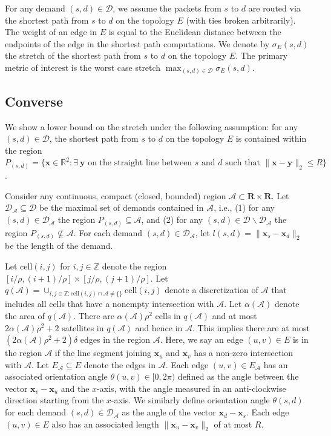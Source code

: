 \documentclass[acmsmall, screen]{acmart}
\begin{document}
For any demand $(s, d) \in \mathcal{D}$, we assume the packets from $s$ to $d$ are routed via the shortest path from $s$ to $d$ on the topology $E$ (with ties broken arbitrarily).
The weight of an edge in $E$ is equal to the Euclidean distance between the endpoints of the edge in the shortest path computations. 
We denote by $\sigma_E(s, d)$ the stretch of the shortest path from $s$ to $d$ on the topology $E$.  
The primary metric of interest is the worst case stretch $\max_{(s, d) \in \mathcal{D}} \sigma_E(s, d)$. 

\subsection{Converse}

We show a lower bound on the stretch under the following assumption: for any $(s, d) \in \mathcal{D}$, the shortest path from $s$ to $d$ on the topology $E$ is contained within the  region $P_{(s,d)} = \{\mathbf{x} \in \mathbb{R}^2: \exists~ \mathbf{y} \text{ on the straight line between } s \text{ and } d \text{ such that } \| \mathbf{x} - \mathbf{y} \|_2 \leq R \} $.

Consider any continuous, compact (closed, bounded) region $\mathcal{A} \subset \mathbf{R} \times \mathbf{R}$. 
Let $\mathcal{D}_\mathcal{A} \subseteq \mathcal{D}$ be the maximal set of demands contained in $\mathcal{A}$, i.e., (1) for any $(s, d) \in \mathcal{D}_\mathcal{A}$ the region $P_{(s,d)} \subseteq \mathcal{A}$, and (2) for any $(s, d) \in \mathcal{D} \backslash \mathcal{D}_\mathcal{A}$ the region $P_{(s,d)} \nsubseteq \mathcal{A}$. 
For each demand $(s, d) \in \mathcal{D}_\mathcal{A}$, let $ l(s,d) = \| \mathbf{x}_{s} - \mathbf{x}_{d}\|_2 $ be the length of the demand. 

Let $\mathrm{cell}(i,j)$ for $i, j \in \mathbb{Z}$ denote the region $[i/\rho, (i+1)/\rho] \times [j/\rho, (j+1)/\rho]$. 
Let $q(\mathcal{A}) = \cup_{i, j \in \mathbb{Z}: \mathrm{cell}(i,j) \cap \mathcal{A} \neq \{ \}} \mathrm{cell}(i,j)$ denote a discretization of $\mathcal{A}$ that includes all cells that have a nonempty intersection with $\mathcal{A}$.  
Let $\alpha(\mathcal{A})$ denote the area of $q(\mathcal{A})$. 
There are $\alpha(\mathcal{A}) \rho^2$ cells in $q(\mathcal{A})$ and at most $2\alpha(\mathcal{A})\rho^2 + 2$ satellites in $q(\mathcal{A})$ and hence in $\mathcal{A}$.  
This implies there are at most $(2\alpha(\mathcal{A}) \rho^2 + 2) \delta$ edges in the region $\mathcal{A}$.
Here, we say an edge $(u, v) \in E$ is in the region $\mathcal{A}$ if the line segment joining $\mathbf{x}_u$ and $\mathbf{x}_v$ has a non-zero intersection with $\mathcal{A}$.  
Let $E_\mathcal{A} \subseteq E$ denote the edges in $\mathcal{A}$. 
Each edge $(u, v) \in E_\mathcal{A}$ has an associated orientation angle $\theta(u ,v) \in [0, 2\pi)$ defined as the angle between the vector $\mathbf{x}_v - \mathbf{x}_u$ and the $x$-axis, with the angle measured in an anti-clockwise direction starting from the $x$-axis.  
We similarly define orientation angle $\theta(s,d)$ for each demand $(s,d) \in \mathcal{D}_\mathcal{A}$ as the angle of the vector $\mathbf{x}_d - \mathbf{x}_s$. 
Each edge $(u, v) \in E$ also has an associated length $\| \mathbf{x}_u - \mathbf{x}_v\|_2$ of at most $R$. 
\end{document}
